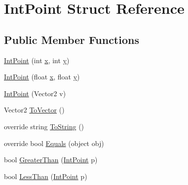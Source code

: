 \hypertarget{struct_int_point}{}\section{Int\+Point Struct Reference}
\label{struct_int_point}
\subsection*{Public Member Functions}
\begin{DoxyCompactItemize}
\item 
\mbox{\hyperlink{struct_int_point_a553ad71275bc778ad20bda98cb3b760c}{Int\+Point}} (int \mbox{\hyperlink{struct_int_point_a939365b5f010e65361371b8ee69c2080}{x}}, int \mbox{\hyperlink{struct_int_point_ac7e0bbc435a90aac2c4136ec83e3f3ef}{y}})
\item 
\mbox{\hyperlink{struct_int_point_a89c7250ab8d007dfc10123d4eb5a32ca}{Int\+Point}} (float \mbox{\hyperlink{struct_int_point_a939365b5f010e65361371b8ee69c2080}{x}}, float \mbox{\hyperlink{struct_int_point_ac7e0bbc435a90aac2c4136ec83e3f3ef}{y}})
\item 
\mbox{\hyperlink{struct_int_point_ab12389b14a95036d62ab7449458b0da1}{Int\+Point}} (Vector2 v)
\item 
Vector2 \mbox{\hyperlink{struct_int_point_a755fe840cba345e23b9adba59c954ee1}{To\+Vector}} ()
\item 
override string \mbox{\hyperlink{struct_int_point_a1d4d1b0f6bdabf751d65167bd9c257c8}{To\+String}} ()
\item 
override bool \mbox{\hyperlink{struct_int_point_af2fa9d4fae137e551b3365cacbad2cdc}{Equals}} (object obj)
\item 
bool \mbox{\hyperlink{struct_int_point_a4164fdfc1ff4c090ac281503b12a447c}{Greater\+Than}} (\mbox{\hyperlink{struct_int_point}{Int\+Point}} p)
\item 
bool \mbox{\hyperlink{struct_int_point_a8a4396b524a0872981a7a7505b19bde7}{Less\+Than}} (\mbox{\hyperlink{struct_int_point}{Int\+Point}} p)
\end{DoxyCompactItemize}
